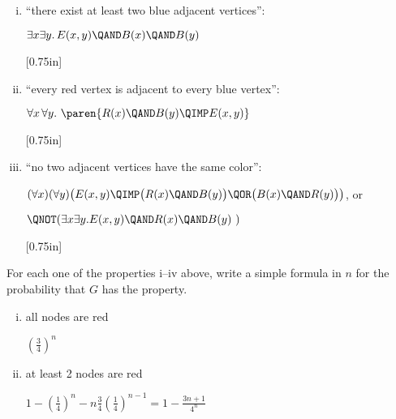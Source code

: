 \documentclass[quiz]{mcs}
\renewcommand{\examspace}{}  %
\begin{document}
\begin{problem}
\begin{enumerate}[(i)]
\item ``there exist at least two blue adjacent vertices'':

\begin{solution}
$\exists x\exists y.\, E(x,y) \QAND B(x) \QAND B(y)$
\end{solution}
\examspace[0.75in]

\item ``every red vertex is adjacent to every blue vertex'': 

\begin{solution}
$\forall x\, \forall y.\ \paren{R(x) \QAND B(y) \QIMP E(x,y)}$
\end{solution}

\examspace[0.75in]

\item  \label{item-difficult} ``no two adjacent vertices have the same color'': 

\begin{solution}
$(\forall x)(\forall y)\bigl( 
	E(x,y) 
	\QIMP
	\bigl( R(x) \QAND B(y) \bigr)
	\QOR
	\bigl( B(x) \QAND R(y) \bigr)
\bigr)$, or

$\QNOT(\exists x \exists y.E(x,y) \QAND R(x) \QAND B(y)\ )$
\end{solution}

\examspace[0.75in]

\end{enumerate}


\ppart For each one of the properties i--iv above, write a simple
formula in $n$ for the probability that $G$ has the property.

\begin{enumerate}[(i)]

\item all nodes are red
\begin{solution}
\brule{0.5in}	$(\tfrac{3}{4})^n$
\end{solution}
 
%

%

\item at least 2 nodes are red
\begin{solution}
 	$1 - (\tfrac{1}{4})^n - n\tfrac{3}{4}(\tfrac{1}{4})^{n-1}
	=
	1 - \tfrac{3n+1}{4^n}$
\end{solution}\brule{0.5in}


\end{enumerate}
\end{problem}
\end{document}
